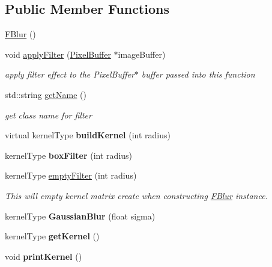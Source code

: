 \subsection*{Public Member Functions}
\begin{DoxyCompactItemize}
\item 
\hyperlink{classFBlur_a21af159e46bb29908e80b73f09a159df}{F\+Blur} ()
\item 
void \hyperlink{classFBlur_a20d9f9bb8f2b787273a860779853a8fd}{apply\+Filter} (\hyperlink{classPixelBuffer}{Pixel\+Buffer} $\ast$image\+Buffer)\hypertarget{classFBlur_a20d9f9bb8f2b787273a860779853a8fd}{}\label{classFBlur_a20d9f9bb8f2b787273a860779853a8fd}

\begin{DoxyCompactList}\small\item\em apply filter effect to the Pixel\+Buffer$\ast$ buffer passed into this function \end{DoxyCompactList}\item 
std\+::string \hyperlink{classFBlur_a3c121581f48e00e0267f88826808ee23}{get\+Name} ()\hypertarget{classFBlur_a3c121581f48e00e0267f88826808ee23}{}\label{classFBlur_a3c121581f48e00e0267f88826808ee23}

\begin{DoxyCompactList}\small\item\em get class name for filter \end{DoxyCompactList}\item 
virtual kernel\+Type {\bfseries build\+Kernel} (int radius)\hypertarget{classFBlur_ad7d9aa0fa6b3b4f4ead1545ccf6a6628}{}\label{classFBlur_ad7d9aa0fa6b3b4f4ead1545ccf6a6628}

\item 
kernel\+Type {\bfseries box\+Filter} (int radius)\hypertarget{classFBlur_a97ca2bede17042bae70d781859d46e73}{}\label{classFBlur_a97ca2bede17042bae70d781859d46e73}

\item 
kernel\+Type \hyperlink{classFBlur_ab13f7d8c36423e3f0ecabdcd9b045fbf}{empty\+Filter} (int radius)\hypertarget{classFBlur_ab13f7d8c36423e3f0ecabdcd9b045fbf}{}\label{classFBlur_ab13f7d8c36423e3f0ecabdcd9b045fbf}

\begin{DoxyCompactList}\small\item\em This will empty kernel matrix create when constructing \hyperlink{classFBlur}{F\+Blur} instance. \end{DoxyCompactList}\item 
kernel\+Type {\bfseries Gaussian\+Blur} (float sigma)\hypertarget{classFBlur_ad88afc728cb9b8c84443a0bf4a30983f}{}\label{classFBlur_ad88afc728cb9b8c84443a0bf4a30983f}

\item 
kernel\+Type {\bfseries get\+Kernel} ()\hypertarget{classFBlur_a7cb16fe19cd319be83d95de5686e8d39}{}\label{classFBlur_a7cb16fe19cd319be83d95de5686e8d39}

\item 
void {\bfseries print\+Kernel} ()\hypertarget{classFBlur_a5f500e9bad040039fb43e58be03d57e6}{}\label{classFBlur_a5f500e9bad040039fb43e58be03d57e6}

\end{DoxyCompactItemize}
